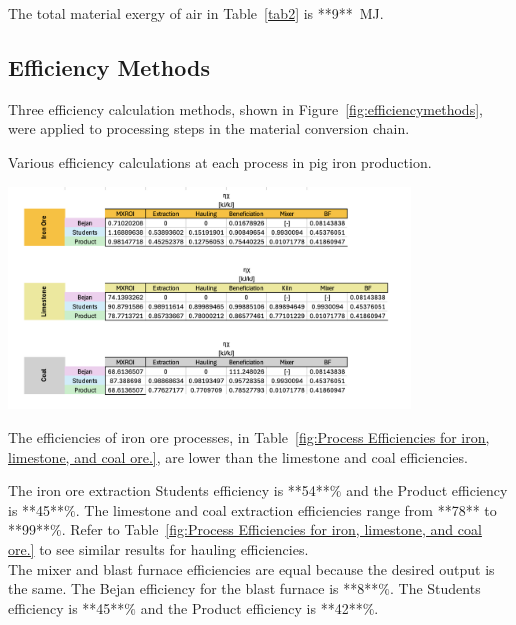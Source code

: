 \documentclass[energies,article,submit,pdftex,moreauthors]{Definitions/mdpi}
\begin{document}
The total material exergy of air
in Table~\ref{tab2} is **9**~MJ.


\subsection{Efficiency Methods}
\label{ssec: efficiency methods}

Three efficiency calculation methods,
shown in Figure~\ref{fig:efficiencymethods},
were applied to processing steps
in the material conversion chain.

\begin{table}
  \centering
  \caption{Various efficiency calculations at each process in pig iron production.}
  \label{fig:Process Efficiencies for iron, limestone, and coal ore.}
  \includegraphics[width=0.8\textwidth]{images/efficiency_tables.pdf}

\end{table}

The efficiencies of iron ore processes,
in Table~\ref{fig:Process Efficiencies for iron, limestone, and coal ore.},
are lower than the limestone and coal efficiencies.

The iron ore extraction Students efficiency is **54**$\%$
and the Product efficiency is **45**$\%$.
The limestone and coal extraction efficiencies range
from **78** to **99**$\%$.
Refer to Table~\ref{fig:Process Efficiencies for iron, limestone, and coal ore.}
to see similar results
for hauling efficiencies.\\
The mixer and blast furnace efficiencies
are equal because the desired output is the same.
The Bejan efficiency
for the blast furnace
is **8**$\%$.
The Students efficiency is **45**$\%$
and the Product efficiency is **42**$\%$.
\end{document}
